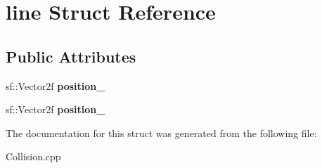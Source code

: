 \hypertarget{structline}{}\section{line Struct Reference}
\label{structline}
\subsection*{Public Attributes}
\begin{DoxyCompactItemize}
\item 
\hypertarget{structline_ac4127aaee294d10936b36dddc0b9a893}{}sf\+::\+Vector2f {\bfseries position\+\_}\label{structline_ac4127aaee294d10936b36dddc0b9a893}

\item 
\hypertarget{structline_acb38224c3fc5c931dfa15d268c3d88a8}{}sf\+::\+Vector2f {\bfseries position\+\_}\label{structline_acb38224c3fc5c931dfa15d268c3d88a8}

\end{DoxyCompactItemize}


The documentation for this struct was generated from the following file\+:\begin{DoxyCompactItemize}
\item 
Collision.\+cpp\end{DoxyCompactItemize}
